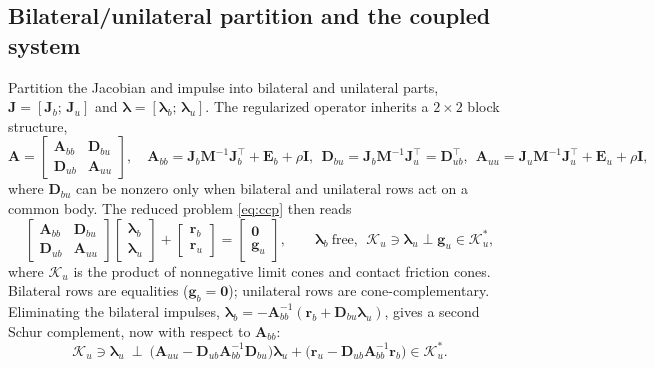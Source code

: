 \documentclass{article}
\newcommand{\M}{\mathbf{M}}
\newcommand{\Jac}{\mathbf{J}}
\newcommand{\Del}{\mathbf{D}}         %
\newcommand{\Ecomp}{\mathbf{E}}       %
\newcommand{\Aop}{\mathbf{A}}         %
\newcommand{\blam}{\boldsymbol{\lambda}}
\newcommand{\rhs}{\mathbf{r}}
\newcommand{\Kadm}{\mathcal{K}}          %
\newcommand{\gvel}{\mathbf{g}}           %
\newcommand{\reg}{\rho}                  %
\newcommand{\Id}{\mathbf{I}}
\theoremstyle{plain}
\theoremstyle{definition}
\begin{document}
\subsection{Bilateral/unilateral partition and the coupled system}
\label{sec:coupled}
Partition the Jacobian and impulse into bilateral and unilateral parts,
$\Jac=[\Jac_b;\,\Jac_u]$ and $\blam=[\blam_b;\,\blam_u]$. The regularized
operator inherits a $2\times2$ block structure,
\begin{equation}
\Aop=\begin{bmatrix}\Aop_{bb}&\Del_{bu}\\ \Del_{ub}&\Aop_{uu}\end{bmatrix},
\quad
\Aop_{bb}=\Jac_b\M^{-1}\Jac_b^{\top}+\Ecomp_b+\reg\Id,\ \
\Del_{bu}=\Jac_b\M^{-1}\Jac_u^{\top}=\Del_{ub}^{\top},\ \
\Aop_{uu}=\Jac_u\M^{-1}\Jac_u^{\top}+\Ecomp_u+\reg\Id,
\label{eq:partitioned-operator}
\end{equation}
where $\Del_{bu}$ can be nonzero only when bilateral and unilateral rows act on
a common body. The reduced problem \eqref{eq:ccp} then reads
\begin{equation}
\begin{bmatrix}\Aop_{bb}&\Del_{bu}\\ \Del_{ub}&\Aop_{uu}\end{bmatrix}
\begin{bmatrix}\blam_b\\ \blam_u\end{bmatrix}
+\begin{bmatrix}\rhs_b\\ \rhs_u\end{bmatrix}
=\begin{bmatrix}\mathbf 0\\ \gvel_u\end{bmatrix},
\qquad
\blam_b\ \text{free},\ \ \Kadm_u\ni\blam_u\perp\gvel_u\in\Kadm_u^{*},
\label{eq:coupled}
\end{equation}
where $\Kadm_u$ is the product of nonnegative limit cones and contact friction
cones. Bilateral rows are equalities ($\gvel_b=\mathbf 0$); unilateral rows are
cone-complementary. Eliminating the bilateral impulses,
$\blam_b=-\Aop_{bb}^{-1}(\rhs_b+\Del_{bu}\blam_u)$, gives a second Schur
complement, now with respect to $\Aop_{bb}$:
\begin{equation}
\Kadm_u\ni\blam_u\ \perp\
\bigl(\Aop_{uu}-\Del_{ub}\Aop_{bb}^{-1}\Del_{bu}\bigr)\blam_u
+\bigl(\rhs_u-\Del_{ub}\Aop_{bb}^{-1}\rhs_b\bigr)\in\Kadm_u^{*}.
\label{eq:schur}
\end{equation}
\end{document}
